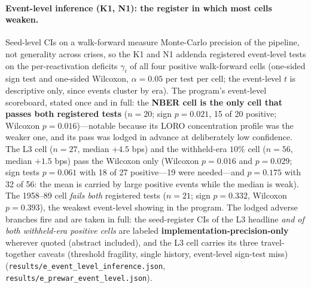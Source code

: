 \documentclass{article}
\begin{document}
\paragraph{Event-level inference (K1, N1): the register in which
most cells weaken.} Seed-level CIs on a walk-forward measure
Monte-Carlo precision of the pipeline, not generality across crises,
so the K1 and N1 addenda registered event-level tests on the
per-reactivation deficits $\gamma_i$ of all four positive
walk-forward cells (one-sided sign test and one-sided Wilcoxon,
$\alpha{=}0.05$ per test per cell; the event-level $t$ is
descriptive only, since events cluster by era). The program's
event-level scoreboard, stated once and in full: the \textbf{NBER
cell is the only cell that passes both registered tests}
($n{=}20$; sign $p = 0.021$, 15 of 20 positive; Wilcoxon
$p = 0.016$)---notable because its LORO concentration profile was
the weaker one, and its pass was lodged in advance at deliberately
low confidence. The L3 cell ($n{=}27$, median $+4.5$ bps) and the
withheld-era $10\%$ cell ($n{=}56$, median $+1.5$ bps) pass the
Wilcoxon only (Wilcoxon $p = 0.016$ and $p = 0.029$; sign tests
$p = 0.061$ with 18 of 27 positive---19 were needed---and
$p = 0.175$ with 32 of 56: the mean is carried by large positive
events while the median is weak). The 1958--89 cell \emph{fails
both} registered tests ($n{=}21$; sign $p = 0.332$, Wilcoxon
$p = 0.393$), the weakest event-level showing in the program. The
lodged adverse branches fire and are taken in full: the
seed-register CIs of the L3 headline \emph{and of both withheld-era
positive cells} are labeled \textbf{implementation-precision-only}
wherever quoted (abstract included), and the L3 cell carries its
three travel-together caveats (threshold fragility, single history,
event-level sign-test miss)
(\texttt{results/e\_event\_level\_inference.json},
\texttt{results/e\_prewar\_event\_level.json}).
\end{document}
